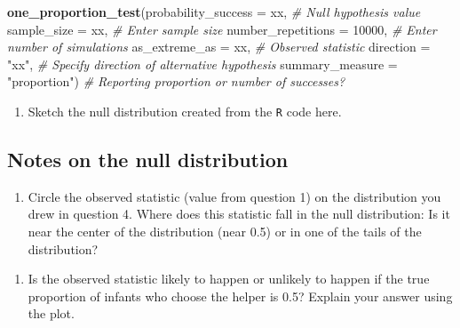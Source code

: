 \documentclass[
]{report}
\newenvironment{Shaded}{\begin{snugshade}}{\end{snugshade}}
\newcommand{\AttributeTok}[1]{\textcolor[rgb]{0.13,0.29,0.53}{#1}}
\newcommand{\CommentTok}[1]{\textcolor[rgb]{0.56,0.35,0.01}{\textit{#1}}}
\newcommand{\DecValTok}[1]{\textcolor[rgb]{0.00,0.00,0.81}{#1}}
\newcommand{\FunctionTok}[1]{\textcolor[rgb]{0.13,0.29,0.53}{\textbf{#1}}}
\newcommand{\NormalTok}[1]{#1}
\newcommand{\StringTok}[1]{\textcolor[rgb]{0.31,0.60,0.02}{#1}}
\providecommand{\tightlist}{%
  \setlength{\itemsep}{0pt}\setlength{\parskip}{0pt}}
\begin{document}
\begin{Shaded}
\begin{Highlighting}[]
\FunctionTok{one\_proportion\_test}\NormalTok{(}\AttributeTok{probability\_success =}\NormalTok{ xx, }\CommentTok{\# Null hypothesis value}
          \AttributeTok{sample\_size =}\NormalTok{ xx, }\CommentTok{\# Enter sample size}
          \AttributeTok{number\_repetitions =} \DecValTok{10000}\NormalTok{, }\CommentTok{\# Enter number of simulations}
          \AttributeTok{as\_extreme\_as =}\NormalTok{ xx, }\CommentTok{\# Observed statistic}
          \AttributeTok{direction =} \StringTok{"xx"}\NormalTok{, }\CommentTok{\# Specify direction of alternative hypothesis}
          \AttributeTok{summary\_measure =} \StringTok{"proportion"}\NormalTok{) }\CommentTok{\# Reporting proportion or number of successes?}
\end{Highlighting}
\end{Shaded}

\begin{enumerate}
\def\labelenumi{\arabic{enumi}.}
\setcounter{enumi}{3}
\tightlist
\item
  Sketch the null distribution created from the \texttt{R} code here.
\end{enumerate}

\vspace{1.8in}

\subsection*{Notes on the null distribution}\label{notes-on-the-null-distribution}

\vspace{2in}

\begin{enumerate}
\def\labelenumi{\arabic{enumi}.}
\setcounter{enumi}{4}
\tightlist
\item
  Circle the observed statistic (value from question 1) on the distribution you drew in question 4. Where does this statistic fall in the null distribution: Is it near the center of the distribution (near 0.5) or in one of the tails of the distribution?
\end{enumerate}

\vspace{0.3in}

\begin{enumerate}
\def\labelenumi{\arabic{enumi}.}
\setcounter{enumi}{5}
\tightlist
\item
  Is the observed statistic likely to happen or unlikely to happen if the true proportion of infants who choose the helper is 0.5? Explain your answer using the plot.
\end{enumerate}
\end{document}
